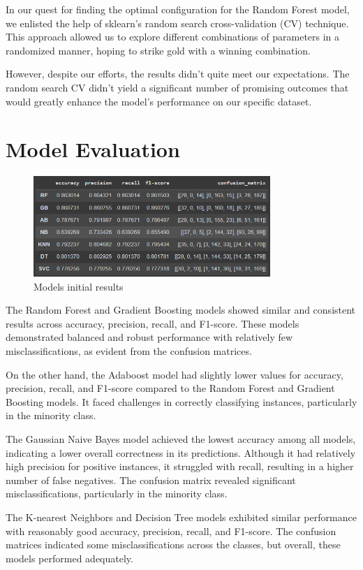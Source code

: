 In our quest for finding the optimal configuration for the Random Forest model, we enlisted the help of sklearn's random search cross-validation (CV) technique. This approach allowed us to explore different combinations of parameters in a randomized manner, hoping to strike gold with a winning combination.

However, despite our efforts, the results didn't quite meet our expectations. The random search CV didn't yield a significant number of promising outcomes that would greatly enhance the model's performance on our specific dataset.

\section{Model Evaluation}
\begin{figure}[h!]
    \centering
    \includegraphics[width=0.8\textwidth]{imgs/initial_results.png}
    \caption{Models initial results}
    \label{fig:results}
\end{figure}
The Random Forest and Gradient Boosting models showed similar and consistent results across accuracy, precision, recall, and F1-score. These models demonstrated balanced and robust performance with relatively few misclassifications, as evident from the confusion matrices.

On the other hand, the Adaboost model had slightly lower values for accuracy, precision, recall, and F1-score compared to the Random Forest and Gradient Boosting models. It faced challenges in correctly classifying instances, particularly in the minority class.

The Gaussian Naive Bayes model achieved the lowest accuracy among all models, indicating a lower overall correctness in its predictions. Although it had relatively high precision for positive instances, it struggled with recall, resulting in a higher number of false negatives. The confusion matrix revealed significant misclassifications, particularly in the minority class.

The K-nearest Neighbors and Decision Tree models exhibited similar performance with reasonably good accuracy, precision, recall, and F1-score. The confusion matrices indicated some misclassifications across the classes, but overall, these models performed adequately.

